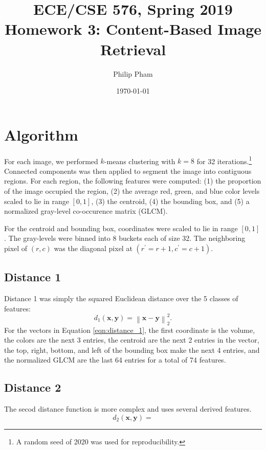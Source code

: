 \documentclass[letterpaper]{article}
\author{Philip Pham}
\title{\Large ECE/CSE 576, Spring 2019 Homework 3: Content-Based Image Retrieval}
\date{\today}
\begin{document}
\maketitle

\section{Algorithm}

For each image, we performed $k$-means clustering with $k = 8$ for 32
iterations.\footnote{A random seed of 2020 was used for reproducibility.}
Connected components was then applied to segment the image into contiguous
regions. For each region, the following features were computed: (1) the
proportion of the image occupied the region, (2) the average red, green, and
blue color levels scaled to lie in range $[0,1]$, (3) the centroid, (4) the
bounding box, and (5) a normalized gray-level co-occurence matrix (GLCM).

For the centroid and bounding box, coordinates were scaled to lie in range
$[0, 1]$. The gray-levels were binned into 8 buckets each of size 32. The
neighboring pixel of $(r, c)$ was the diagonal pixel at
$\left(r^\prime = r + 1, c^\prime = c + 1\right)$.

\subsection{Distance 1}

Distance 1 was simply the squared Euclidean distance over the 5 classes of
features:
\begin{equation}
  d_1\left(\mathbf{x}, \mathbf{y}\right) = \left\lVert \mathbf{x} - \mathbf{y}\right\rVert_2^2.
  \label{eqn:distance_1}
\end{equation}
For the vectors in Equation \ref{eqn:distance_1}, the first coordinate is the
volume, the colors are the next 3 entries, the centroid are the next 2 entries
in the vector, the top, right, bottom, and left of the bounding box make the
next 4 entries, and the normalized GLCM are the last 64 entries for a total of
74 features.

\subsection{Distance 2}

The secod distance function is more complex and uses several derived features.
\begin{equation}
  d_2\left(\mathbf{x}, \mathbf{y}\right) = 
  \label{eqn:distance_2}
\end{equation}
\end{document}
